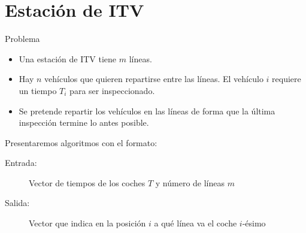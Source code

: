 \section{Estación de ITV}

\begin{frame}{Problema}
\begin{itemize}
	\item Una estación de ITV tiene $m$ líneas.
	\pause
	\item Hay $n$ vehículos que quieren repartirse entre las líneas. El vehículo $i$
	requiere un tiempo $T_i$ para ser inspeccionado.
	\pause
	\item Se pretende repartir los vehículos en las líneas de forma que la última
	inspección termine lo antes posible.
\end{itemize}
\pause

Presentaremos algoritmos con el formato:
\begin{description}
 \item[Entrada:] Vector de tiempos de los coches $T$ y número de líneas $m$
 \item[Salida:] Vector que indica en la posición $i$ a qué línea va el coche $i$-ésimo
\end{description}
\end{frame}




